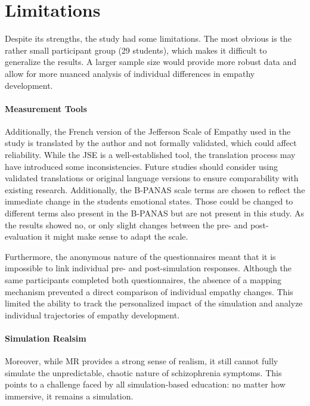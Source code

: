 \section{Limitations}

Despite its strengths, the study had some limitations. The most obvious is the rather small participant group (29 students), which makes it difficult to generalize the results. A larger sample size would provide more robust data and allow for more nuanced analysis of individual differences in empathy development.

\paragraph{Measurement Tools} Additionally, the French version of the Jefferson Scale of Empathy used in the study is translated by the author and not formally validated, which could affect reliability. While the JSE is a well-established tool, the translation process may have introduced some inconsistencies. Future studies should consider using validated translations or original language versions to ensure comparability with existing research. Additionally, the B-PANAS scale terms are chosen to reflect the immediate change in the students emotional states. Those could be changed to different terms also present in the B-PANAS but are not present in this study. As the results showed no, or only slight changes between the pre- and post-evaluation it might make sense to adapt the scale. 

\vspace{1em}

Furthermore, the anonymous nature of the questionnaires meant that it is impossible to link individual pre- and post-simulation responses. Although the same participants completed both questionnaires, the absence of a mapping mechanism prevented a direct comparison of individual empathy changes. This limited the ability to track the personalized impact of the simulation and analyze individual trajectories of empathy development.


\paragraph{Simulation Realsim} Moreover, while MR provides a strong sense of realism, it still cannot fully simulate the unpredictable, chaotic nature of schizophrenia symptoms. This points to a challenge faced by all simulation-based education: no matter how immersive, it remains a simulation. 

